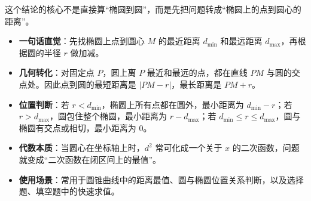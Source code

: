 \begin{explanationbox}
这个结论的核心不是直接算“椭圆到圆”，而是先把问题转成“椭圆上的点到圆心的距离”。

\begin{itemize}
    \item \textbf{一句话直觉}：先找椭圆上点到圆心 $M$ 的最近距离 $d_{\min}$ 和最远距离 $d_{\max}$，再根据圆的半径 $r$ 做加减。
    \item \textbf{几何转化}：对固定点 $P$，圆上离 $P$ 最近和最远的点，都在直线 $PM$ 与圆的交点处。因此点到圆的最短距离是 $|PM-r|$，最长距离是 $PM+r$。
    \item \textbf{位置判断}：若 $r<d_{\min}$，椭圆上所有点都在圆外，最小距离为 $d_{\min}-r$；若 $r>d_{\max}$，圆包住整个椭圆，最小距离为 $r-d_{\max}$；若 $d_{\min}\le r\le d_{\max}$，圆与椭圆有交点或相切，最小距离为 $0$。
    \item \textbf{代数本质}：当圆心在坐标轴上时，$d^2$ 常可化成一个关于 $x$ 的二次函数，问题就变成“二次函数在闭区间上的最值”。
    \item \textbf{使用场景}：常用于圆锥曲线中的距离最值、圆与椭圆位置关系判断，以及选择题、填空题中的快速求值。
\end{itemize}
\end{explanationbox}
